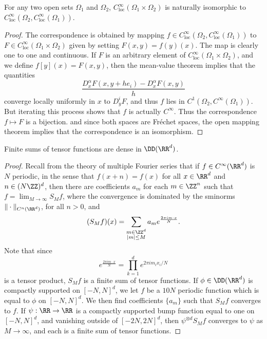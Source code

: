 \begin{theorem}
    For any two open sets $\Omega_1$ and $\Omega_2$, $C^\infty_{\text{loc}}(\Omega_1 \times \Omega_2)$ is naturally isomorphic to $C^\infty_{\text{loc}}(\Omega_2, C^\infty_{\text{loc}}(\Omega_1))$.
\end{theorem}
\begin{proof}
    The correspondence is obtained by mapping $f \in C^\infty_{\text{loc}}(\Omega_2, C^\infty_{\text{loc}}(\Omega_1))$ to $F \in C^\infty_{\text{loc}}(\Omega_1 \times \Omega_2)$ given by setting $F(x,y) = f(y)(x)$. The map is clearly one to one and continuous. If $F$ is an arbitrary element of $C^\infty_{\text{loc}}(\Omega_1 \times \Omega_2)$, and we define $f[y](x) = F(x,y)$, then the mean-value theorem implies that the quantities
    \[ \frac{D^\alpha_x F(x,y + he_i) - D^\alpha_x F(x,y)}{h} \]
    converge locally uniformly in $x$ to $D_y^i F$, and thus $f$ lies in $C^1(\Omega_2, C^\infty(\Omega_1))$. But iterating this process shows that $f$ is actually $C^\infty$. Thus the correspondence $f \mapsto F$ is a bijection. and since both spaces are Fr\'{e}chet spaces, the open mapping theorem implies that the correspondence is an isomorphism.
\end{proof}

\begin{theorem}
    Finite sums of tensor functions are dense in $\DD(\RR^d)$.
\end{theorem}
\begin{proof}
    Recall from the theory of multiple Fourier series that if $f \in C^\infty(\RR^d)$ is $N$ periodic, in the sense that $f(x + n) = f(x)$ for all $x \in \RR^d$ and $n \in (N \ZZ)^d$, then there are coefficients $a_m$ for each $m \in \ZZ^n$ such that $f = \lim_{M \to \infty} S_M f$, where the convergence is dominated by the sminorms $\| \cdot \|_{C^n(\RR^d)}$, for all $n > 0$, and
    \[ (S_M f)(x) = \sum_{\substack{m \in \ZZ^d\\|m| \leq M}} a_m e^{\frac{2 \pi i m \cdot x}{N}}. \]
    Note that since
    \[ e^{\frac{2 \pi i m \cdot x}{N}} = \prod_{k = 1}^d e^{2 \pi i m_ix_i/N} \]
    is a tensor product, $S_M f$ is a finite sum of tensor functions. If $\phi \in \DD(\RR^d)$ is compactly supported on $[-N,N]^d$, we let $f$ be a $10N$ periodic function which is equal to $\phi$ on $[-N,N]^d$. We then find coefficients $\{ a_m \}$ such that $S_M f$ converges to $f$. If $\psi: \RR \to \RR$ is a compactly supported bump function equal to one on $[-N,N]^d$, and vanishing outside of $[-2N,2N]^d$, then $\psi^{\otimes d} S_M f$ converges to $\psi$ as $M \to \infty$, and each is a finite sum of tensor functions.
\end{proof}

